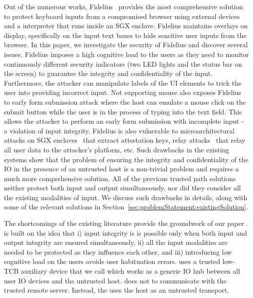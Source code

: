 Out of the numerous works, Fidelius~\cite{Fidelius} provides the most comprehensive solution to protect keyboard inputs from a compromised browser using external devices and a \js interpreter that runs inside an SGX enclave. Fidelius maintains overlays on display, specifically on the input text boxes to hide sensitive user inputs from the browser. In this paper, we investigate the security of Fidelius and discover several issues. Fidelius imposes a high cognitive load to the users as they need to monitor continuously different security indicators (two LED lights and the status bar on the screen) to guarantee the integrity and confidentiality of the input. Furthermore, the attacker can manipulate labels of the UI elements to trick the user into providing incorrect input. Not supporting mouse also exposes Fidelius to early form submission attack where the host can emulate a mouse click on the submit button while the user is in the process of typing into the text field. This allows the attacker to perform an early form submission with incomplete input - a violation of input integrity. Fidelius is also vulnerable to microarchitectural attacks on SGX enclaves~\cite{van2018foreshadow} that extract attestation keys, relay attacks~\cite{dhar2018proximitee} that relay all user data to the attacker's platform, etc. Such drawbacks in the existing systems show that the problem of ensuring the integrity and confidentiality of the IO in the presence of an untrusted host is a non-trivial problem and requires a much more comprehensive solution. All of the previous trusted path solutions neither protect both input and output simultaneously, nor did they consider all the existing modalities of input. We discuss such drawbacks in details, along with some of the relevant solutions in Section~\ref{sec:problemStatement:existingSolution}.

 
 The shortcomings of the existing literature provide the groundwork of our paper \name. %
\name is built on the idea that i) input integrity is is possible only when both input and output integrity are ensured simultaneously, ii) all the input modalities are needed to be protected as they influence each other, and iii) introducing low cognitive load on the users avoids user habituation errors. \name uses a trusted low-TCB auxiliary device that we call \device which works as a generic IO hub between all user IO devices and the untrusted host. \device does not  to communicate with the trusted remote server. Instead, the \device uses the host as an untrusted transport.

